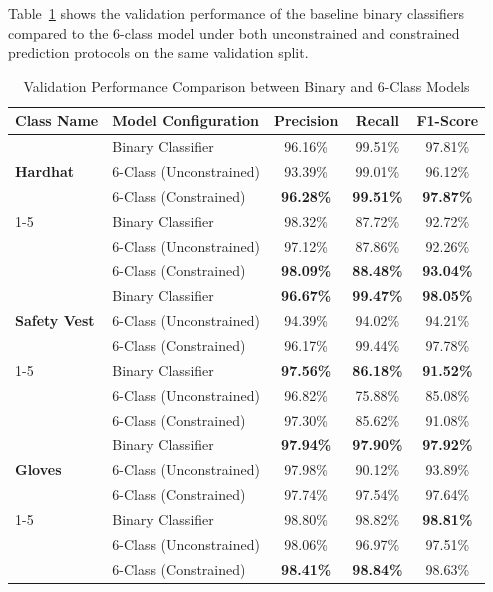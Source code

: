 \documentclass[11pt,a4paper]{article}
\begin{document}
Table~\ref{tab:six_class_val_comparison} shows the validation performance of the baseline binary classifiers compared to the 6-class model under both unconstrained and constrained prediction protocols on the same validation split.

\begin{table}[H]
\centering
\caption{Validation Performance Comparison between Binary and 6-Class Models}
\label{tab:six_class_val_comparison}
\begin{tabular}{@{}llccc@{}}
\toprule
\textbf{Class Name} & \textbf{Model Configuration} & \textbf{Precision} & \textbf{Recall} & \textbf{F1-Score} \\ \midrule
\multirow{3}{*}{\textbf{Hardhat}} & Binary Classifier & 96.16\% & 99.51\% & 97.81\% \\
 & 6-Class (Unconstrained) & 93.39\% & 99.01\% & 96.12\% \\
 & 6-Class (Constrained) & \textbf{96.28\%} & \textbf{99.51\%} & \textbf{97.87\%} \\ \cmidrule(lr){1-5}
\multirow{3}{*}{\textbf{NO-Hardhat}} & Binary Classifier & 98.32\% & 87.72\% & 92.72\% \\
 & 6-Class (Unconstrained) & 97.12\% & 87.86\% & 92.26\% \\
 & 6-Class (Constrained) & \textbf{98.09\%} & \textbf{88.48\%} & \textbf{93.04\%} \\ \midrule
\multirow{3}{*}{\textbf{Safety Vest}} & Binary Classifier & \textbf{96.67\%} & \textbf{99.47\%} & \textbf{98.05\%} \\
 & 6-Class (Unconstrained) & 94.39\% & 94.02\% & 94.21\% \\
 & 6-Class (Constrained) & 96.17\% & 99.44\% & 97.78\% \\ \cmidrule(lr){1-5}
\multirow{3}{*}{\textbf{NO-Safety Vest}} & Binary Classifier & \textbf{97.56\%} & \textbf{86.18\%} & \textbf{91.52\%} \\
 & 6-Class (Unconstrained) & 96.82\% & 75.88\% & 85.08\% \\
 & 6-Class (Constrained) & 97.30\% & 85.62\% & 91.08\% \\ \midrule
\multirow{3}{*}{\textbf{Gloves}} & Binary Classifier & \textbf{97.94\%} & \textbf{97.90\%} & \textbf{97.92\%} \\
 & 6-Class (Unconstrained) & 97.98\% & 90.12\% & 93.89\% \\
 & 6-Class (Constrained) & 97.74\% & 97.54\% & 97.64\% \\ \cmidrule(lr){1-5}
\multirow{3}{*}{\textbf{NO-Gloves}} & Binary Classifier & 98.80\% & 98.82\% & \textbf{98.81\%} \\
 & 6-Class (Unconstrained) & 98.06\% & 96.97\% & 97.51\% \\
 & 6-Class (Constrained) & \textbf{98.41\%} & \textbf{98.84\%} & 98.63\% \\ \bottomrule
\end{tabular}
\end{table}
\end{document}
